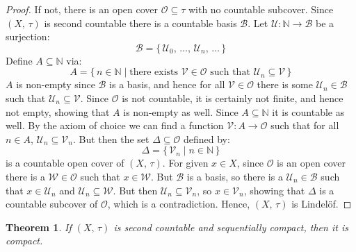 \documentclass{article}
\theoremstyle{plain}
\newtheorem{theorem}{Theorem}[section]
\theoremstyle{normal}
\begin{document}
        \begin{proof}
            If not, there is an open cover $\mathcal{O}\subseteq\tau$ with no
            countable subcover. Since $(X,\,\tau)$ is second countable there is
            a countable basis $\mathcal{B}$. Let
            $\mathcal{U}:\mathbb{N}\rightarrow\mathcal{B}$ be a surjection:
            \begin{equation}
                \mathcal{B}=
                \{\,\mathcal{U}_{0},\,\dots,\,\mathcal{U}_{n},\,\dots\,\}
            \end{equation}
            Define $A\subseteq\mathbb{N}$ via:
            \begin{equation}
                A=\{\,n\in\mathbb{N}\;|\;\textrm{there exists }
                    \mathcal{V}\in\mathcal{O}\textrm{ such that }
                    \mathcal{U}_{n}\subseteq\mathcal{V}\,\}
            \end{equation}
            $A$ is non-empty since $\mathcal{B}$ is a basis, and hence for
            all $\mathcal{V}\in\mathcal{O}$ there is some
            $\mathcal{U}_{n}\in\mathcal{B}$ such that
            $\mathcal{U}_{n}\subseteq\mathcal{V}$. Since $\mathcal{O}$ is not
            countable, it is certainly not finite, and hence not empty, showing
            that $A$ is non-empty as well. Since $A\subseteq\mathbb{N}$ it is
            countable as well. By the axiom of choice we can find
            a function $\mathcal{V}:A\rightarrow\mathcal{O}$ such that for all
            $n\in{A}$, $\mathcal{U}_{n}\subseteq\mathcal{V}_{n}$. But then the
            set $\Delta\subseteq\mathcal{O}$ defined by:
            \begin{equation}
                \Delta=\{\,\mathcal{V}_{n}\;|\;n\in\mathbb{N}\,\}
            \end{equation}
            is a countable open cover of $(X,\,\tau)$. For given
            $x\in{X}$, since $\mathcal{O}$ is an open cover there is a
            $\mathcal{W}\in\mathcal{O}$ such that $x\in\mathcal{W}$. But
            $\mathcal{B}$ is a basis, so there is a
            $\mathcal{U}_{n}\in\mathcal{B}$ such that $x\in\mathcal{U}_{n}$ and
            $\mathcal{U}_{n}\subseteq\mathcal{W}$. But then
            $\mathcal{U}_{n}\subseteq\mathcal{V}_{n}$, so
            $x\in\mathcal{V}_{n}$, showing that $\Delta$ is a countable
            subcover of $\mathcal{O}$, which is a contradiction. Hence,
            $(X,\,\tau)$ is Lindel\"{o}f.
        \end{proof}
        \begin{theorem}
            If $(X,\,\tau)$ is second countable and sequentially compact,
            then it is compact.
        \end{theorem}
\end{document}
